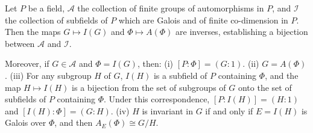 Let $P$ be a field, $\mathcal{A}$ the collection of finite groups of automorphisms in $P$, and $\mathcal{I}$ the collection of subfields of $P$ which are Galois and of finite co-dimension in $P$. Then the maps $G \mapsto I(G)$ and $\Phi \mapsto A(\Phi)$ are inverses, establishing a bijection between $\mathcal{A}$ and $\mathcal{I}$.

Moreover, if $G \in \mathcal{A}$ and $\Phi = I(G)$, then:
(i) $[P:\Phi] = (G:1)$.
(ii) $G = A(\Phi)$.
(iii) For any subgroup $H$ of $G$, $I(H)$ is a subfield of $P$ containing $\Phi$, and the map $H \mapsto I(H)$ is a bijection from the set of subgroups of $G$ onto the set of subfields of $P$ containing $\Phi$. Under this correspondence, $[P:I(H)] = (H:1)$ and $[I(H):\Phi] = (G:H)$.
(iv) $H$ is invariant in $G$ if and only if $E = I(H)$ is Galois over $\Phi$, and then $A_E(\Phi) \cong G/H$.

